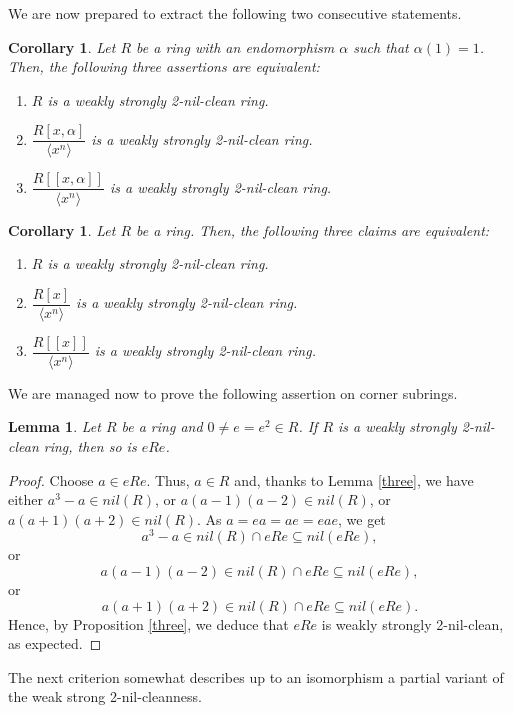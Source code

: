 \documentclass[12pt]{amsart}
\newtheorem{lemma}[theorem]{Lemma}
\newtheorem{corollary}[theorem]{Corollary}
\theoremstyle{definition}
\begin{document}
We are now prepared to extract the following two consecutive statements.

\begin{corollary}\label{2.21}
Let $R$ be a ring with an endomorphism $\alpha$ such that $\alpha (1)=1$. Then, the following three assertions are equivalent:
\begin{enumerate}
\item
$R$ is a weakly strongly 2-nil-clean ring.
\item
$\dfrac{R[x,\alpha ]}{\langle x^{n}\rangle }$ is a weakly strongly 2-nil-clean ring.
\item
$\dfrac{R[[x,\alpha ]]}{\langle x^{n}\rangle }$ is a weakly strongly 2-nil-clean ring.
\end{enumerate}
\end{corollary}

\begin{corollary}
Let $R$ be a ring. Then, the following three claims are equivalent:
\begin{enumerate}
\item
$R$ is a weakly strongly 2-nil-clean ring.
\item
$\dfrac{R[x]}{\langle x^{n}\rangle }$ is a weakly strongly 2-nil-clean ring.
\item
$\dfrac{R[[x]]}{\langle x^{n}\rangle }$ is a weakly strongly 2-nil-clean ring.
\end{enumerate}
\end{corollary}

We are managed now to prove the following assertion on corner subrings. 

\begin{lemma}\label{2.14}
Let $R$ be a ring and $0\neq e=e^2\in R$. If $R$ is a weakly strongly 2-nil-clean ring, then so is $eRe$.
\end{lemma}

\begin{proof}
Choose $a \in eRe$. Thus, $a\in R$ and, thanks to Lemma \ref{three}, we have either  $a^3-a\in nil(R)$, or $a(a-1)(a-2)\in nil(R)$, or $a(a+1)(a+2)\in nil(R)$. As $a = ea = ae = eae$, we get $$a^3-a\in nil(R)\cap eRe\subseteq nil(eRe),$$ or $$a(a-1)(a-2)\in nil(R)\cap eRe\subseteq nil(eRe),$$ or $$a(a+1)(a+2)\in nil(R)\cap eRe\subseteq nil(eRe).$$  Hence, by Proposition \ref{three}, we deduce that $eRe$ is weakly strongly 2-nil-clean, as expected.
\end{proof}

The next criterion somewhat describes up to an isomorphism a partial variant of the weak strong 2-nil-cleanness.
\end{document}
